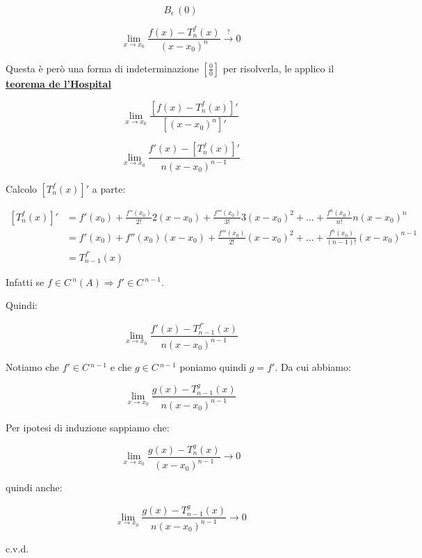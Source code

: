 \documentclass[../dimostrazioni]{subfiles}
\begin{document}
        \[ B_\epsilon \, (0)\]

        \[  \lim_{x \to x_0} \frac{f(x)-T _n ^ f (x)}{(x-x_0)^n} \stackrel{?}{\rightarrow} 0\]

        Questa è però una forma di indeterminazione \(\left[\frac{0}{0}\right]\) per risolverla, le applico il \textbf{\hyperref[teoHopital]{teorema de l'Hospital}}
        
        \[  \lim_{x \to x_0} \frac{\left[f(x)-T _n ^ f (x)\right]'}{\left[(x-x_0)^n\right]'}    \]

        \[  \lim_{x \to x_0} \frac{f'(x)-\left[T _n ^ f (x)\right]'}{n(x-x_0)^{n-1}}    \]

        Calcolo \(\left[T _n ^ f (x)\right]'\) a parte:

        \begin{align*}
            \left[T _n ^ f (x)\right]' &= f'(x_0) + \frac{f''(x_0)}{2!}2(x-x_0) + \frac{f'''(x_0)}{3!}3(x-x_0)^2 + \dots + \frac{f^n(x_0)}{n!}n(x-x_0)^n \\
                                    &= f'(x_0) + f''(x_0)(x-x_0) + \frac{f'''(x_0)}{2!}(x-x_0)^2 + \dots + \frac{f^n(x_0)}{(n-1)!}(x-x_0)^{n-1} \\
                                    &= T_{n-1} ^{f'} (x)
        \end{align*}

        Infatti se \(f \in C\,^n (A) \Rightarrow f' \in C\,^{n-1} \).

        Quindi:

        \[  \lim_{x \to x_0} \frac{f'(x)-T_{n-1} ^{f'} (x)}{n(x-x_0)^{n-1}}    \]

        Notiamo che \(f' \in C\,^{n-1}\) e che \(g \in C\,^{n-1}\) poniamo quindi \(g = f'\). Da cui abbiamo:

        \[  \lim_{x \to x_0} \frac{g(x)-T_{n-1} ^{g} (x)}{n(x-x_0)^{n-1}}    \]

        Per ipotesi di induzione sappiamo che:

        \[  \lim_{x \to x_0} \frac{g(x) - T _n ^ g (x)}{(x-x_0)^{n-1}} \rightarrow 0 \]

        quindi anche:

        \[  \lim_{x \to x_0} \frac{g(x)-T_{n-1} ^{g} (x)}{n(x-x_0)^{n-1}}  \rightarrow 0  \]

        c.v.d.

        
\end{document}
